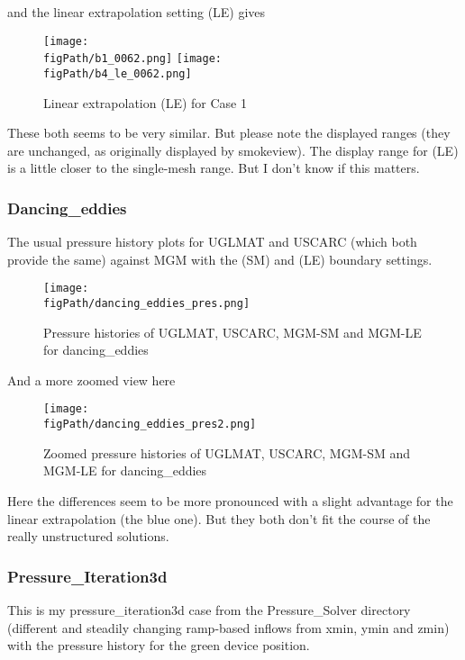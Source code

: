 and the linear extrapolation setting (LE) gives

\begin{figure}[H]
\begin{center}
\texttt{[image: \\figPath/b1\_0062.png]}
\texttt{[image: \\figPath/b4\_le\_0062.png]}
\end{center}
\caption{Linear extrapolation  (LE) for Case 1}
\label{FIG_MGM_Grid}
\end{figure}


These both seems to be very similar.  But please note the displayed ranges (they are unchanged, as originally displayed by smokeview).
The display range for (LE) is a little closer to the single-mesh range. But I don't know if this matters.

\newpage
\subsubsection{Dancing\_eddies}
The usual pressure history plots for UGLMAT and USCARC (which both provide the same) against MGM with the (SM) and (LE) boundary settings.
\begin{figure}[H]
\begin{center}
\texttt{[image: \\figPath/dancing\_eddies\_pres.png]}
\end{center}
\caption{Pressure histories of UGLMAT, USCARC, MGM-SM and MGM-LE for dancing\_eddies}
\label{FIG_MGM_de}
\end{figure}

And a more zoomed view here
\begin{figure}[H]
\begin{center}
\texttt{[image: \\figPath/dancing\_eddies\_pres2.png]}
\end{center}
\caption{Zoomed pressure histories of UGLMAT, USCARC, MGM-SM and MGM-LE for dancing\_eddies}
\label{FIG_MGM_de}
\end{figure}

Here the differences seem to be more pronounced with a slight advantage for the linear extrapolation (the blue one). But they both don't fit the course of the
really unstructured solutions.

\newpage
\subsubsection{Pressure\_Iteration3d}
This is my pressure\_iteration3d case from the Pressure\_Solver directory (different and steadily changing ramp-based inflows from xmin, ymin and zmin)
with the pressure history for the green device position.

